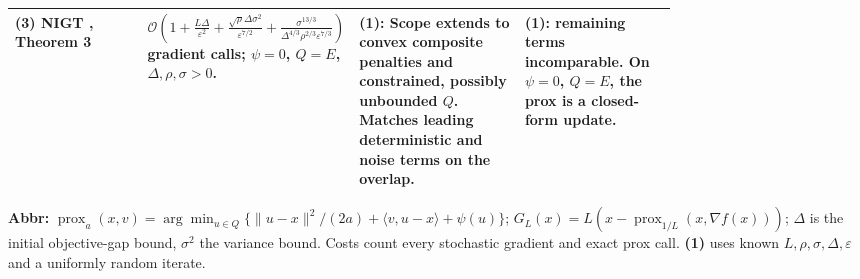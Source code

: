 \begin{table}[tp]
\begin{threeparttable}
\begin{tabularx}{\linewidth}{@{}>{\raggedright\arraybackslash}p{0.20\linewidth}>{\raggedright\arraybackslash}p{0.32\linewidth}>{\raggedright\arraybackslash}p{0.25\linewidth}>{\raggedright\arraybackslash}X@{}}
\midrule
\textbf{(3)} NIGT \citep{schlCutkosky2020}, Theorem 3 & $\mathcal{O}\!\left(1+\frac{L\Delta}{\varepsilon^2}+\frac{\sqrt\rho\Delta\sigma^2}{\varepsilon^{7/2}}+\frac{\sigma^{13/3}}{\Delta^{4/3}\rho^{2/3}\varepsilon^{7/3}}\right)$ gradient calls; $\psi=0$, $Q=E$, $\Delta,\rho,\sigma>0$. & \textbf{(1)}: Scope extends to convex composite penalties and constrained, possibly unbounded $Q$. Matches leading deterministic and noise terms on the overlap. & \textbf{(1)}: remaining terms incomparable. On $\psi=0$, $Q=E$, the prox is a closed-form update. \\
\bottomrule
\end{tabularx}
\begin{tablenotes}[flushleft]\footnotesize
\item[] \textbf{Abbr:} $\operatorname{prox}_a(x,v)=\arg\min_{u\in Q}\{\|u-x\|^2/(2a)+\langle v,u-x\rangle+\psi(u)\}$; $G_L(x)=L(x-\operatorname{prox}_{1/L}(x,\nabla f(x)))$; $\Delta$ is the initial objective-gap bound, $\sigma^2$ the variance bound. Costs count every stochastic gradient and exact prox call. \textbf{(1)} uses known $L,\rho,\sigma,\Delta,\varepsilon$ and a uniformly random iterate.
\end{tablenotes}
\end{threeparttable}
\end{table}
\clearpage

